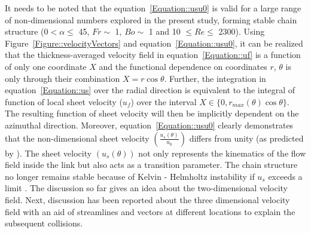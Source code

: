 It needs to be noted that the equation~\ref{Equation::usu0} is valid for a large range of non-dimensional numbers explored in the present study, forming stable chain structure (0\degree $< \alpha \le$  45\degree, $Fr \sim$ 1, $Bo \sim$ 1 and 10 $\le Re \le$ 2300).  Using Figure~\ref{Figure::velocityVectors} and equation~\ref{Equation::usu0}, it can be realized that the thickness-averaged velocity field in equation~\ref{Equation::uf} is a function of only one coordinate $X$ and the functional dependence on coordinates $r$, $\theta$ is only through their combination $X = r\cos\theta$. Further, the integration in equation~\ref{Equation::us} over the radial direction is equivalent to the integral of function of local sheet velocity ($u_f$) over the interval $X \in \{0, r_{max}(\theta)\cos\theta\}$. The resulting function of sheet velocity will then be implicitly dependent on the azimuthal direction. Moreover, equation~\ref{Equation::usu0} clearly demonstrates that the non-dimensional sheet velocity $\left(\frac{u_s(\theta)}{u_0}\right)$ differs from unity (as predicted by \citet{choo2002velocity}). The sheet velocity $\left(u_s(\theta)\right)$ not only represents the kinematics of the flow field inside the link but also acts as a transition parameter. The chain structure no longer remains stable because of Kelvin - Helmholtz instability if $u_s$ exceeds a limit \citep{villermaux2002life}. The discussion so far gives an idea about the two-dimensional velocity field. Next, discussion has been reported about the three dimensional velocity field with an aid of streamlines and vectors at different locations to explain the subsequent collisions.
